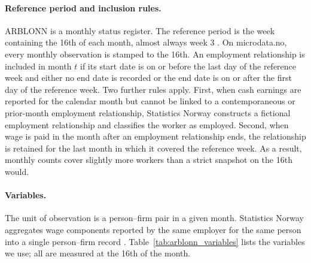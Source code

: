 \documentclass[12pt]{article}
\begin{document}
\paragraph{Reference period and inclusion rules.}
ARBLONN is a monthly status register. The reference period is the week containing the 16th of each month, almost always week 3 \citep{ssb_klassifisering}. On microdata.no, every monthly observation is stamped to the 16th. An employment relationship is included in month $t$ if its start date is on or before the last day of the reference week and either no end date is recorded or the end date is on or after the first day of the reference week. Two further rules apply. First, when cash earnings are reported for the calendar month but cannot be linked to a contemporaneous or prior-month employment relationship, Statistics Norway constructs a fictional employment relationship and classifies the worker as employed. Second, when wage is paid in the month after an employment relationship ends, the relationship is retained for the last month in which it covered the reference week. As a result, monthly counts cover slightly more workers than a strict snapshot on the 16th would.

\paragraph{Variables.}
The unit of observation is a person--firm pair in a given month. Statistics Norway aggregates wage components reported by the same employer for the same person into a single person--firm record \citep{ssb_klassifisering}. Table~\ref{tab:arblonn_variables} lists the variables we use; all are measured at the 16th of the month.
\end{document}
